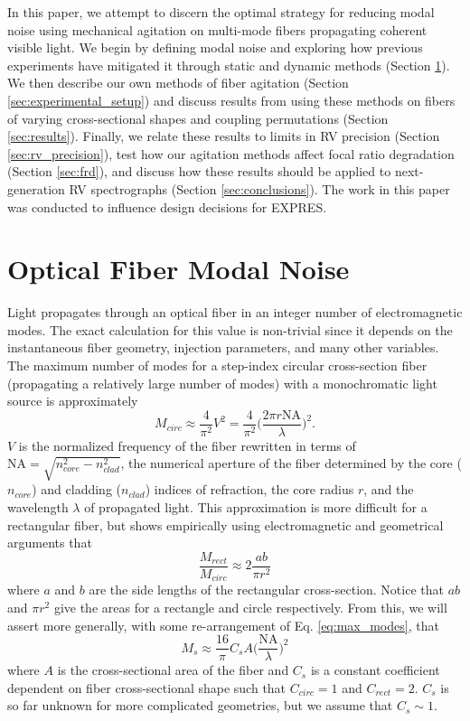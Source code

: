 \documentclass[twocolumn]{emulateapj}
\begin{document}
In this paper, we attempt to discern the optimal strategy for reducing modal noise using mechanical agitation on multi-mode fibers propagating coherent visible light. We begin by defining modal noise and exploring how previous experiments have mitigated it through static and dynamic methods (Section \ref{sec:modal_noise_intro}). We then describe our own methods of fiber agitation (Section \ref{sec:experimental_setup}) and discuss results from using these methods on fibers of varying cross-sectional shapes and coupling permutations (Section \ref{sec:results}). Finally, we relate these results to limits in RV precision (Section \ref{sec:rv_precision}), test how our agitation methods affect focal ratio degradation (Section {\ref{sec:frd}}), and discuss how these results should be applied to next-generation RV spectrographs (Section \ref{sec:conclusions}). The work in this paper was conducted to influence design decisions for EXPRES.

\section{Optical Fiber Modal Noise}
\label{sec:modal_noise_intro}

Light propagates through an optical fiber in an integer number of electromagnetic modes. The exact calculation for this value is non-trivial since it depends on the instantaneous fiber geometry, injection parameters, and many other variables. The maximum number of modes for a step-index circular cross-section fiber (propagating a relatively large number of modes) with a monochromatic light source is approximately
\begin{equation}
M_{circ} \approx \frac{4}{\pi ^2} V^2 = \frac{4}{\pi ^2} \Bigg( \frac{2 \pi r \mathrm{NA}}{\lambda} \Bigg) ^2.
\label{eq:max_modes}
\end{equation}
$V$ is the normalized frequency of the fiber rewritten in terms of $\mathrm{NA} = \sqrt{n_{core}^2 - n_{clad}^2}$, the numerical aperture of the fiber determined by the core ($n_{core}$) and cladding ($n_{clad}$) indices of refraction, the core radius $r$, and the wavelength $\lambda$ of propagated light. This approximation is more difficult for a rectangular fiber, but \citet{Nikitin2011} shows empirically using electromagnetic and geometrical arguments that
\begin{equation}
\frac{M_{rect}}{M_{circ}} \approx 2 \frac{ab}{\pi r^2}
\label{eq:prop_modes}
\end{equation}
where $a$ and $b$ are the side lengths of the rectangular cross-section. Notice that $ab$ and $\pi r^2$ give the areas for a rectangle and circle respectively. From this, we will assert more generally, with some re-arrangement of Eq. \ref{eq:max_modes}, that
\begin{equation}
M_{s} \approx \frac{16}{\pi} C_{s} A \Bigg( \frac{\mathrm{NA}}{\lambda} \Bigg) ^2
\label{eq:mode_area}
\end{equation}
where $A$ is the cross-sectional area of the fiber and $C_{s}$ is a constant coefficient dependent on fiber cross-sectional shape such that $C_{circ} = 1$ and $C_{rect} = 2$. $C_{s}$ is so far unknown for more complicated geometries, but we assume that $C_{s} \sim 1$.
\end{document}
